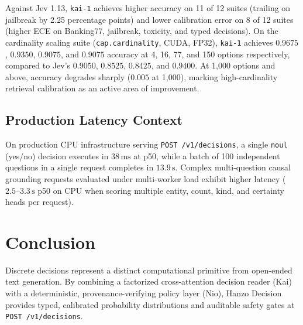 \documentclass[11pt,a4paper]{article}
\begin{document}
Against Jev 1.13, \texttt{kai-1} achieves higher accuracy on 11 of 12 suites (trailing on jailbreak by 2.25 percentage points) and lower calibration error on 8 of 12 suites (higher ECE on Banking77, jailbreak, toxicity, and typed decisions). On the cardinality scaling suite (\texttt{cap.cardinality}, CUDA, FP32), \texttt{kai-1} achieves $0.9675$, $0.9350$, $0.9075$, and $0.9075$ accuracy at 4, 16, 77, and 150 options respectively, compared to Jev's $0.9050$, $0.8525$, $0.8425$, and $0.9400$. At 1,000 options and above, accuracy degrades sharply ($0.005$ at 1,000), marking high-cardinality retrieval calibration as an active area of improvement.

\subsection{Production Latency Context}
On production CPU infrastructure serving \texttt{POST /v1/decisions}, a single \texttt{noul} (yes/no) decision executes in $38\,\text{ms}$ at p50, while a batch of 100 independent questions in a single request completes in $13.9\,\text{s}$. Complex multi-question causal grounding requests evaluated under multi-worker load exhibit higher latency ($2.5\text{--}3.3\,\text{s}$ p50 on CPU when scoring multiple entity, count, kind, and certainty heads per request).

\section{Conclusion}

Discrete decisions represent a distinct computational primitive from open-ended text generation. By combining a factorized cross-attention decision reader (Kai) with a deterministic, provenance-verifying policy layer (Nio), Hanzo Decision provides typed, calibrated probability distributions and auditable safety gates at \texttt{POST /v1/decisions}.
\end{document}
